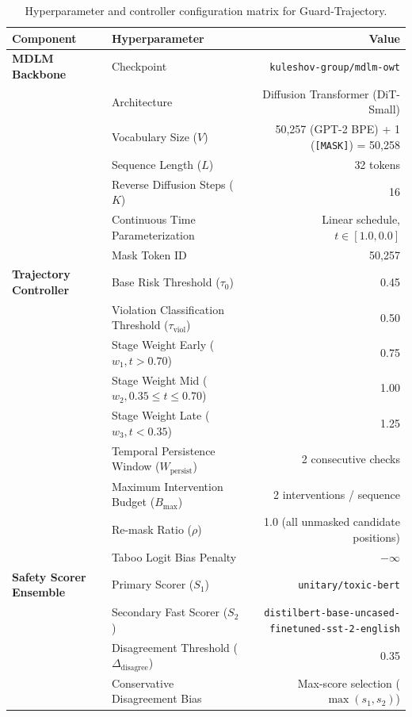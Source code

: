 \documentclass[conference]{IEEEtran}
\begin{document}
\begin{table}[!t]
\centering
\caption{Hyperparameter and controller configuration matrix for Guard-Trajectory.}
\label{tab:app_hyperparams}
\small
\begin{tabular}{llr}
\toprule
\textbf{Component} & \textbf{Hyperparameter} & \textbf{Value} \\
\midrule
\textbf{MDLM Backbone} & Checkpoint & \texttt{kuleshov-group/mdlm-owt} \\
& Architecture & Diffusion Transformer (DiT-Small) \\
& Vocabulary Size ($V$) & 50,257 (GPT-2 BPE) + 1 (\texttt{[MASK]}) = 50,258 \\
& Sequence Length ($L$) & 32 tokens \\
& Reverse Diffusion Steps ($K$) & 16 \\
& Continuous Time Parameterization & Linear schedule, $t \in [1.0, 0.0]$ \\
& Mask Token ID & 50,257 \\
\midrule
\textbf{Trajectory Controller} & Base Risk Threshold ($\tau_0$) & 0.45 \\
& Violation Classification Threshold ($\tau_{\text{viol}}$) & 0.50 \\
& Stage Weight Early ($w_1, t > 0.70$) & 0.75 \\
& Stage Weight Mid ($w_2, 0.35 \le t \le 0.70$) & 1.00 \\
& Stage Weight Late ($w_3, t < 0.35$) & 1.25 \\
& Temporal Persistence Window ($W_{\text{persist}}$) & 2 consecutive checks \\
& Maximum Intervention Budget ($B_{\text{max}}$) & 2 interventions / sequence \\
& Re-mask Ratio ($\rho$) & 1.0 (all unmasked candidate positions) \\
& Taboo Logit Bias Penalty & $-\infty$ \\
\midrule
\textbf{Safety Scorer Ensemble} & Primary Scorer ($S_1$) & \texttt{unitary/toxic-bert} \\
& Secondary Fast Scorer ($S_2$) & \texttt{distilbert-base-uncased-finetuned-sst-2-english} \\
& Disagreement Threshold ($\Delta_{\text{disagree}}$) & 0.35 \\
& Conservative Disagreement Bias & Max-score selection ($\max(s_1, s_2)$) \\
\bottomrule
\end{tabular}
\end{table}
\end{document}
